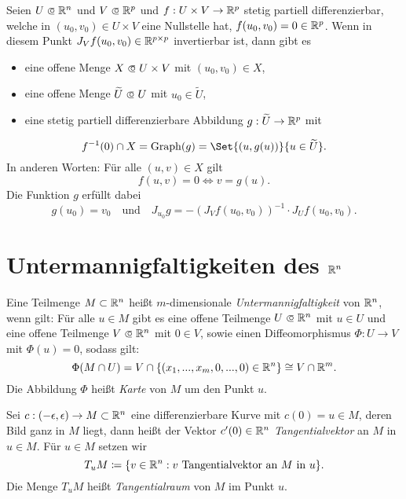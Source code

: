 \documentclass{cheat-sheet}
\DeclareMathOperator{\Graph}{Graph} %
\begin{document}
\begin{samepage}

\begin{satz}
  Seien $U \opn \R^n$ und $V \opn \R^p$ und $f : U \times V \to \mathbb{R}^p$ stetig partiell differenzierbar, welche in $(u_0, v_0) \in U \times V$ eine Nullstelle hat, \dh{} $f(u_0, v_0) = 0 \in \mathbb{R}^p$. Wenn in diesem Punkt $J_V f(u_0, v_0) \in \mathbb{R}^{p \times p}$ invertierbar ist, dann gibt es
  \begin{itemize}
    \item eine offene Menge $X \opn U \times V$ mit $(u_0, v_0) \in X$,
    \item eine offene Menge $\widetilde{U} \opn U$ mit $u_0 \in \widetilde{U}$,
    \item eine stetig partiell differenzierbare Abbildung $g : \widetilde{U} \to \mathbb{R}^p$ mit
  \end{itemize}
  \[ f^{-1}(0) \cap X = \Graph(g) = \Set{ (u, g(u)) }{ u \in \widetilde{U} }. \]
  In anderen Worten: Für alle $(u, v) \in X$ gilt
  \[ f(u, v) = 0 \iff v = g(u). \]
  Die Funktion $g$ erfüllt dabei
  \[ g(u_0) = v_0\quad\text{und}\quad J_{u_0} g = - \left(J_V f(u_0, v_0)\right)^{-1} \cdot J_U f(u_0, v_0). \]
\end{satz}


\section{Untermannigfaltigkeiten des $\mathbb{R}^n$}

\end{samepage}

\begin{defn}
  Eine Teilmenge $M \subset \mathbb{R}^n$ heißt $m$-dimensionale \emph{Untermannigfaltigkeit} von $\mathbb{R}^n$, wenn gilt: Für alle $u \in M$ gibt es eine offene Teilmenge $U \opn \R^n$ mit $u \in U$ und eine offene Teilmenge $V \opn \R^n$ mit $0 \in V$, sowie einen Diffeomorphismus $\Phi : U \to V$ mit $\Phi(u) = 0$, sodass gilt:
    \[ \Phi(M \cap U) = V \cap \{ (x_1, ..., x_m, 0, ..., 0) \in \mathbb{R}^n \} \cong V \cap \mathbb{R}^m. \]
  Die Abbildung $\Phi$ heißt \emph{Karte} von $M$ um den Punkt $u$.
\end{defn}

\begin{defn}
  Sei $c : \left( -\epsilon, \epsilon \right) \to M \subset \mathbb{R}^n$ eine differenzierbare Kurve mit $c(0) = u \in M$, deren Bild ganz in $M$ liegt, dann heißt der Vektor $c'(0) \in \mathbb{R}^n$ \emph{Tangentialvektor} an $M$ in $u \in M$. Für $u \in M$ setzen wir
  \[ T_u M \coloneqq \{ v \in \mathbb{R}^n : v \text{ Tangentialvektor an } M \text{ in } u \}. \]
  Die Menge $T_u M$ heißt \emph{Tangentialraum} von $M$ im Punkt $u$.
\end{defn}
\end{document}
